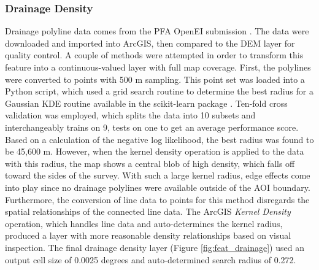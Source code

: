 \subsubsection{Drainage Density}

Drainage polyline data comes from the \citet{bielicki_hydrogeolgic_2015} PFA OpenEI submission \citep{kelley_geothermal_2015}. The data were downloaded and imported into ArcGIS, then compared to the DEM layer for quality control. A couple of methods were attempted in order to transform this feature into a continuous-valued layer with full map coverage. First, the polylines were converted to points with 500 m sampling. This point set was loaded into a Python script, which used a grid search routine to determine the best radius for a Gaussian KDE routine available in the scikit-learn package \citep{pedregosa_scikit-learn_2011}. Ten-fold cross validation was employed, which splits the data into 10 subsets and interchangeably trains on 9, tests on one to get an average performance score. Based on a calculation of the negative log likelihood, the best radius was found to be 45,600 m. However, when the kernel density operation is applied to the data with this radius, the map shows a central blob of high density, which falls off toward the sides of the survey. With such a large kernel radius, edge effects come into play since no drainage polylines were available outside of the AOI boundary. Furthermore, the conversion of line data to points for this method disregards the spatial relationships of the connected line data. The ArcGIS \textit{Kernel Density} operation, which handles line data and auto-determines the kernel radius, produced a layer with more reasonable density relationships based on visual inspection. The final drainage density layer (Figure \ref{fig:feat_drainage}) used an output cell size of 0.0025 degrees and auto-determined search radius of 0.272.

